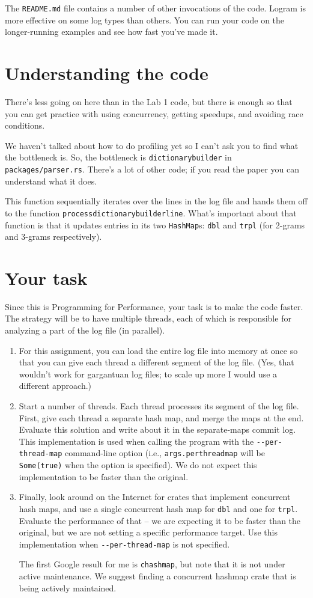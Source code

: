 \documentclass[12pt]{article}
\renewcommand{\_}{\kern-1.5pt\textunderscore\kern-1.5pt}
\begin{document}
The \texttt{README.md} file contains a number of other invocations of the code. Logram is more effective on some log types than others. You can run your code on the longer-running examples and see how fast you've made it.

\section*{Understanding the code}
There's less going on here than in the Lab 1 code, but there is enough so that you can get practice with using concurrency, getting speedups, and avoiding race conditions.

We haven't talked about how to do profiling yet so I can't ask you to find what the bottleneck is. So, the bottleneck is \texttt{dictionary\_builder} in \texttt{packages/parser.rs}. There's a lot of other code; if you read the paper you can understand what it does.

This function sequentially iterates over the lines in the log file and hands them off to the function \texttt{process\_dictionary\_builder\_line}. What's important about that function is that it updates entries in its two \texttt{HashMap}s: \texttt{dbl} and \texttt{trpl} (for 2-grams and 3-grams respectively).

\section*{Your task}
Since this is Programming for Performance, your task is to make the code faster. The strategy will be to have multiple threads, each of which is responsible for analyzing a part of the log file (in parallel).
\begin{enumerate}
\item For this assignment, you can load the entire log file into memory at once so that you can give each thread a different segment of the log file. (Yes, that wouldn't work for gargantuan log files; to scale up more I would use a different approach.)
\item Start a number of threads. Each thread processes its segment of the log file. First, give each thread a separate hash map, and merge the maps at the end. Evaluate this solution and write about it in the separate-maps commit log. This implementation is used when calling the program with the \texttt{-{}-per-thread-map} command-line option (i.e., \texttt{args.per\_thread\_map} will be \texttt{Some(true)} when the option is specified). We do not expect this implementation to be faster than the original.
\item Finally, look around on the Internet for crates that implement concurrent hash maps, and use a single concurrent hash map for \texttt{dbl} and one for \texttt{trpl}. Evaluate the performance of that -- we are expecting it to be faster than the original, but we are not setting a specific performance target. Use this implementation when \texttt{-{}-per-thread-map} is not specified.

  The first Google result for me is \texttt{chashmap}, but note that it is not under active maintenance. We suggest finding a concurrent hashmap crate that is being actively maintained.
\end{enumerate}
\end{document}
